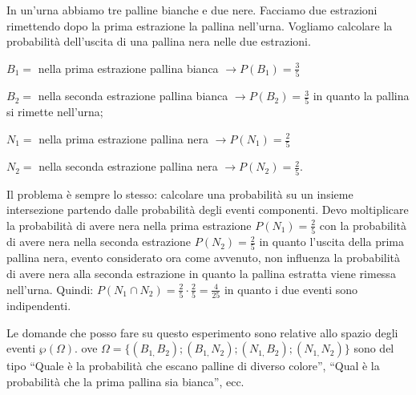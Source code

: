 \begin{esempio}
In un'urna abbiamo tre palline bianche e due nere. Facciamo due estrazioni 
rimettendo dopo la prima estrazione la pallina nell'urna. Vogliamo calcolare la 
probabilità dell'uscita di una pallina nera nelle due estrazioni.
\begin{itemize*}
\item $ B_{1}= $ nella prima estrazione pallina bianca $\to P(B_1)=\frac 3 5$
\item $ B_{2}= $ nella seconda estrazione pallina bianca $\to P(B_2)=\frac 3 5$ 
in quanto la pallina si rimette nell'urna;
\item $ N_{1}= $ nella prima estrazione pallina nera $\to P(N_1)=\frac 2 5$
\item $ N_{2}= $ nella seconda estrazione pallina nera $\to P(N_2)=\frac 2 5$.
\end{itemize*}
Il problema è sempre lo stesso: calcolare una probabilità su un insieme 
intersezione partendo dalle probabilità degli eventi componenti. Devo 
moltiplicare la probabilità di avere nera nella prima estrazione $P(N_1)=\frac 
2 
5$ con la probabilità di avere nera nella seconda estrazione $P(N_2)=\frac 2 5$ 
in quanto l'uscita della prima pallina nera, evento considerato ora come 
avvenuto, non influenza la probabilità di avere nera alla seconda estrazione in 
quanto la pallina estratta viene rimessa nell'urna. Quindi: $P(N_1\cap 
N_2)=\frac 2 5\cdot \frac 2 5=\frac 4{25}$ in quanto i due eventi sono 
indipendenti.
\begin{center}
 
\end{center}
Le domande che posso fare su questo esperimento sono relative allo spazio degli 
eventi $\wp (\Omega ).$ ove $\Omega 
=\{(B_{1,}B_2);(B_{1,}N_2);(N_{1,}B_2);(N_{1,}N_2)\}$ sono del tipo ``Quale è 
la 
probabilità che escano palline di diverso colore'', ``Qual è la probabilità che 
la prima pallina sia bianca'', ecc.
\end{esempio}

